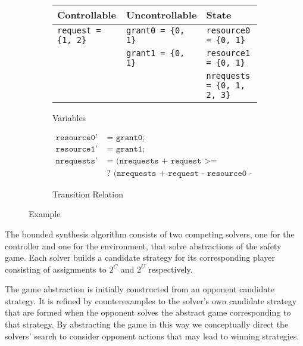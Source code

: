 \documentclass{llncs}
\begin{document}
\begin{figure}
    \begin{subfigure}[t]{\textwidth}
        \centering
        \begin{tabular}{l | l | l}
            \textbf{Controllable} & \textbf{Uncontrollable} & \textbf{State} \\
            \hline
            \texttt{request = \{1, 2\}} & \texttt{grant0 = \{0, 1\}} & \texttt{resource0 = \{0, 1\}} \\
            & \texttt{grant1 = \{0, 1\}} & \texttt{resource1 = \{0, 1\}} \\
            & & \texttt{nrequests = \{0, 1, 2, 3\}} \\
        \end{tabular}
        \caption{Variables}
        \label{fig:examplevars}
    \end{subfigure}

    \begin{subfigure}[t]{\textwidth}
        \begin {align*}
            \texttt{resource0'} & \texttt{ = grant0;} \\
            \texttt{resource1'} & \texttt{ = grant1;} \\
            \texttt{nrequests'} & \texttt{ = (nrequests + request >= resource0 + resource1)} \\ 
                                & \texttt{ ? (nrequests + request - resource0 - resource1) : 0;}
        \end{align*}
        \caption{Transition Relation}
        \label{fig:exampletrans}
    \end{subfigure}
    \caption{Example}
    \label{fig:example}
\end{figure}


The bounded synthesis algorithm consists of two competing solvers, one for the
controller and one for the environment, that solve abstractions of the safety
game. Each solver builds a candidate strategy for its corresponding player
consisting of assignments to $2^C$ and $2^U$ respectively. 

The game abstraction is initially constructed from an opponent candidate
strategy. It is refined by counterexamples to the solver's own candidate
strategy that are formed when the opponent solves the abstract game
corresponding to that strategy. By abstracting the game in this way we
conceptually direct the solvers' search to consider opponent actions that may
lead to winning strategies.
\end{document}

